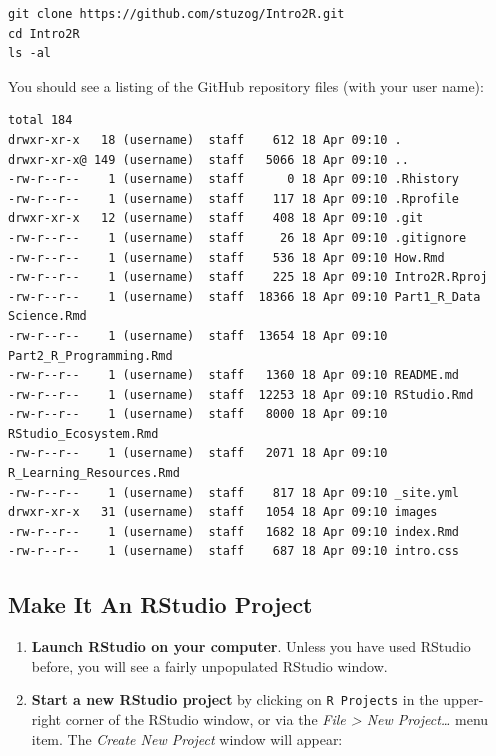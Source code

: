 \documentclass[]{book}
\theoremstyle{definition}
\theoremstyle{definition}
\theoremstyle{definition}
\theoremstyle{remark}
\begin{document}
\begin{verbatim}
git clone https://github.com/stuzog/Intro2R.git
cd Intro2R
ls -al
\end{verbatim}

You should see a listing of the GitHub repository files (with your user
name):

\begin{verbatim}
total 184
drwxr-xr-x   18 (username)  staff    612 18 Apr 09:10 .
drwxr-xr-x@ 149 (username)  staff   5066 18 Apr 09:10 ..
-rw-r--r--    1 (username)  staff      0 18 Apr 09:10 .Rhistory
-rw-r--r--    1 (username)  staff    117 18 Apr 09:10 .Rprofile
drwxr-xr-x   12 (username)  staff    408 18 Apr 09:10 .git
-rw-r--r--    1 (username)  staff     26 18 Apr 09:10 .gitignore
-rw-r--r--    1 (username)  staff    536 18 Apr 09:10 How.Rmd
-rw-r--r--    1 (username)  staff    225 18 Apr 09:10 Intro2R.Rproj
-rw-r--r--    1 (username)  staff  18366 18 Apr 09:10 Part1_R_Data Science.Rmd
-rw-r--r--    1 (username)  staff  13654 18 Apr 09:10 Part2_R_Programming.Rmd
-rw-r--r--    1 (username)  staff   1360 18 Apr 09:10 README.md
-rw-r--r--    1 (username)  staff  12253 18 Apr 09:10 RStudio.Rmd
-rw-r--r--    1 (username)  staff   8000 18 Apr 09:10 RStudio_Ecosystem.Rmd
-rw-r--r--    1 (username)  staff   2071 18 Apr 09:10 R_Learning_Resources.Rmd
-rw-r--r--    1 (username)  staff    817 18 Apr 09:10 _site.yml
drwxr-xr-x   31 (username)  staff   1054 18 Apr 09:10 images
-rw-r--r--    1 (username)  staff   1682 18 Apr 09:10 index.Rmd
-rw-r--r--    1 (username)  staff    687 18 Apr 09:10 intro.css
\end{verbatim}

\hypertarget{make-it-an-rstudio-project}{%
\subsection{Make It An RStudio
Project}\label{make-it-an-rstudio-project}}

\begin{enumerate}
\def\labelenumi{\arabic{enumi}.}
\setcounter{enumi}{2}
\item
  \textbf{Launch RStudio on your computer}. Unless you have used RStudio
  before, you will see a fairly unpopulated RStudio window.
\item
  \textbf{Start a new RStudio project} by clicking on
  \texttt{R\ Projects} in the upper-right corner of the RStudio window,
  or via the \emph{File \textgreater{} New Project\ldots{}} menu item.
  The \emph{Create New Project} window will appear:
\end{enumerate}
\end{document}
